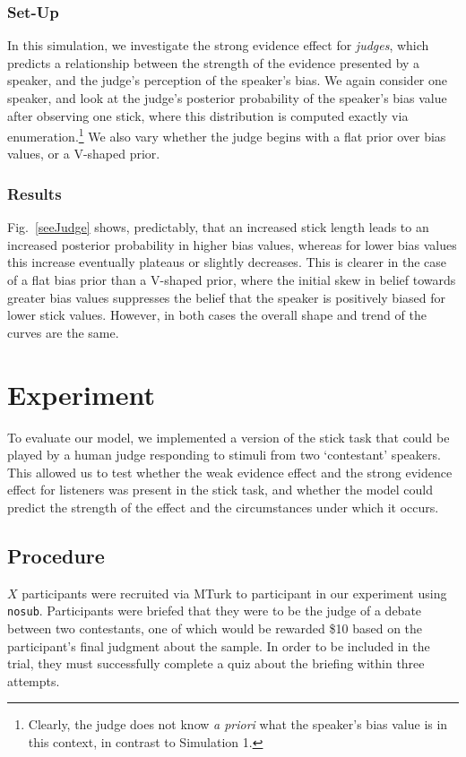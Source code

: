 \documentclass[10pt,letterpaper]{article}
\begin{document}
\subsubsection{Set-Up}
In this simulation, we investigate the strong evidence effect for \textit{judges}, which predicts a relationship between 
the strength of the evidence presented by a speaker, and the judge's perception of the speaker's bias.
We again consider one speaker, and look at the judge's posterior probability of the speaker's bias value after 
observing one stick, where this distribution is computed exactly via enumeration.\footnote{Clearly, the judge does 
not know \textit{a priori} what the speaker's bias value is in this context, in contrast to Simulation 1.} We also vary 
whether the judge begins with a flat prior over bias values, or a V-shaped prior.

\subsubsection{Results}

Fig.~\ref{seeJudge} shows, predictably, that an increased stick length leads to an increased posterior probability in
higher bias values, whereas for lower bias values this increase eventually plateaus or slightly decreases. This is clearer 
in the case of a flat bias prior than a V-shaped prior, where the initial skew in belief towards greater bias values suppresses
the belief that the speaker is positively biased for lower stick values. However, in both cases the overall shape and trend 
of the curves are the same.

\section{Experiment}
To evaluate our model, we implemented a version of the stick task that could be played by a human judge responding to
stimuli from two `contestant' speakers. This allowed us to test whether the weak evidence effect and the strong evidence effect
for listeners was present in the stick task, and whether the model could predict the strength of the effect and the circumstances
under which it occurs.

\subsection{Procedure}
$X$ participants were recruited via MTurk to participant in our experiment using \texttt{nosub}. Participants were briefed
that they were to be the judge of a debate between two contestants, one of which would be rewarded \$10 based on the participant's
final judgment about the sample. In order to be included in the trial, they must successfully complete a quiz about the briefing within
three attempts.
\end{document}
